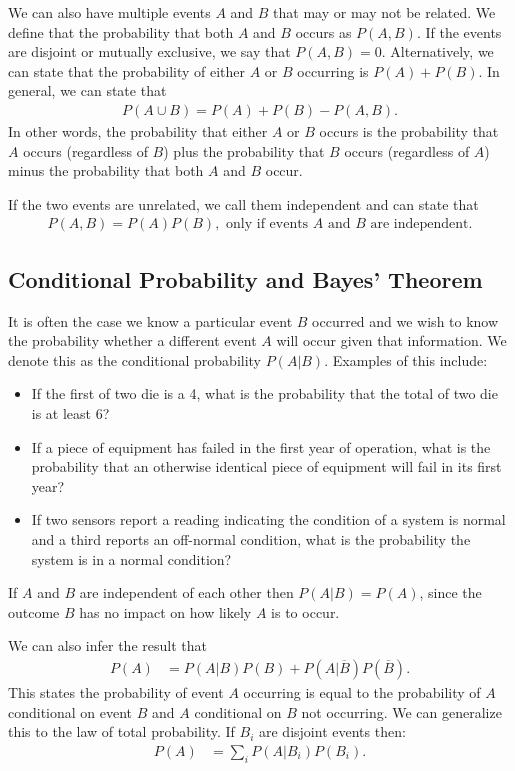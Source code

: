 We can also have multiple events $A$ and $B$ that may or may not be related. We define that the probability that both $A$ and $B$ occurs as $P(A,B)$. If the events are disjoint or mutually exclusive, we say that $P(A,B) = 0$. Alternatively, we can state that the probability of either $A$ or $B$ occurring is $P(A) + P(B)$. In general, we can state that
\begin{align}
  P( A \cup B ) = P(A) + P(B) - P(A,B) .
\end{align}
In other words, the probability that either $A$ or $B$ occurs is the probability that $A$ occurs (regardless of $B$) plus the probability that $B$ occurs (regardless of $A$) minus the probability that both $A$ and $B$ occur.

If the two events are unrelated, we call them independent and can state that
\begin{align}
  P(A,B) = P(A)P(B), \text{ only if events $A$ and $B$ are independent.}
\end{align}

\subsection{Conditional Probability and Bayes' Theorem}

It is often the case we know a particular event $B$ occurred and we wish to know the probability whether a different event $A$ will occur given that information. We denote this as the conditional probability $P(A|B)$. Examples of this include:
\begin{itemize}
  \item If the first of two die is a 4, what is the probability that the total of two die is at least 6?
  \item If a piece of equipment has failed in the first year of operation, what is the probability that an otherwise identical piece of equipment will fail in its first year?
  \item If two sensors report a reading indicating the condition of a system is normal and a third reports an off-normal condition, what is the probability the system is in a normal condition?
\end{itemize}
If $A$ and $B$ are independent of each other then $P(A|B) = P(A)$, since the outcome $B$ has no impact on how likely $A$ is to occur.

We can also infer the result that
\begin{align}
  P(A) &= P(A|B) P(B) + P(A|\overline{B}) P(\overline{B}) .
\end{align}
This states the probability of event $A$ occurring is equal to the probability of $A$ conditional on event $B$ and $A$ conditional on $B$ not occurring. We can generalize this to the law of total probability. If $B_i$ are disjoint events then:
\begin{align}
  P(A) &= \sum_i P(A|B_i) P(B_i) .
\end{align}


